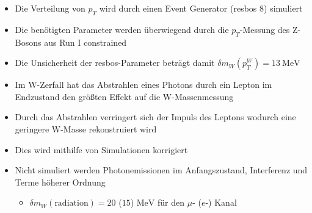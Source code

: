 \documentclass[aspectratio=1610, 9pt]{beamer}
\begin{document}
\begin{frame}
  \begin{itemize}
    \item Die Verteilung von $p_T$ wird durch einen Event Generator (resbos 8) simuliert
    \item Die benötigten Parameter werden überwiegend durch die $p_T$-Messung des Z-Bosons aus Run I constrained
    \item Die Unsicherheit der resbos-Parameter beträgt damit $\delta m_W (p^W_T) = \SI{13}{\MeV}$
  \end{itemize}


\end{frame}

\begin{frame}
  \begin{itemize}
    \item Im W-Zerfall hat das Abstrahlen eines Photons durch ein Lepton im Endzustand den größten Effekt auf die W-Massenmessung
    \item Durch das Abstrahlen verringert sich der Impuls des Leptons wodurch eine geringere W-Masse rekonstruiert wird
    \item Dies wird mithilfe von Simulationen korrigiert
    \item Nicht simuliert werden Photonemissionen im Anfangszustand, Interferenz und Terme höherer Ordnung
    \begin{itemize}
      \item[\rightarrow] $\delta m_W (\text{radiation})= \num{20}$ ($\num{15}$) $\si{\MeV}$ für den $\mu$- ($e$-) Kanal
    \end{itemize}

  \end{itemize}
\end{frame}
\end{document}
